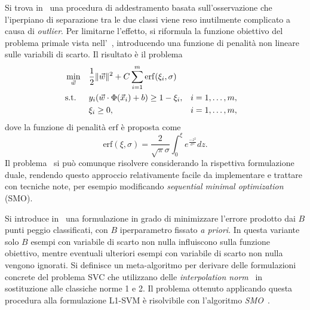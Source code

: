 Si trova in~\cite{2005_penalizing_outliers} una procedura di addestramento basata sull'osservazione che l'iperpiano di separazione tra le due classi viene reso inutilmente complicato a causa di \emph{outlier}. 
Per limitarne l'effetto, si riformula la funzione obiettivo del problema primale vista nell'~, introducendo una funzione di penalità non lineare sulle variabili di scarto. Il risultato è il problema
\begin{equation}\label{eq:adaptively_penalizing_outliers}
\begin{aligned}
& \min_{\Vec{w}}    && \frac{1}{2}\|\Vec{w}\|^2 +C \sum_{i=1}^{m}\mathrm{erf}(\xi_i, \sigma) \\
& \textrm{s.t.}     && y_i(\Vec{w}\cdot\Phi(\Vec{x}_i) + b) \geq 1 -\xi_i, && i=1,\dots,m,\\
&                   && \xi_i \geq 0,  && i=1,\dots,m,
\end{aligned}
\end{equation}
dove la funzione di penalità $\mathrm{erf}$ è proposta come
\[
\mathrm{erf}(\xi, \sigma) = \frac{2}{\sqrt{\pi}\sigma} \int_{0}^{\xi}e^{\frac{-z^2}{\sigma^2}} dz.
\]
%
Il problema~ si può comunque risolvere considerando la rispettiva formulazione duale, rendendo questo approccio relativamente facile da implementare e trattare con tecniche note, per esempio modificando \emph{sequential minimal optimization} (SMO)\cite{SMO}.


Si introduce in~\cite{2006_svm_on_a_budget} una formulazione in grado di minimizzare l'errore prodotto dai $B$ punti peggio classificati, con $B$ iperparametro fissato \emph{a priori}. 
In questa variante solo $B$ esempi con variabile di scarto non nulla influiscono sulla funzione obiettivo, mentre eventuali ulteriori esempi con variabile di scarto non nulla vengono ignorati.
Si definisce un meta-algoritmo per derivare delle formulazioni concrete del problema SVC che utilizzano delle \emph{interpolation norm}~\cite{norm_interpolation} in sostituzione alle classiche norme 1 e 2. 
Il problema ottenuto applicando questa procedura alla formulazione L1-SVM è risolvibile con l'algoritmo \emph{SMO}~\cite{SMO}.

